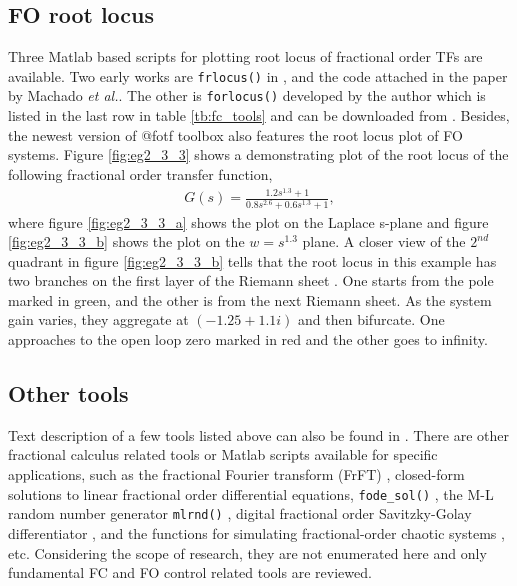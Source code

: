 \documentclass[11pt]{tCON2e}
\theoremstyle{plain}\newtheorem{theorem}{Theorem}
\theoremstyle{definition}
\theoremstyle{remark}
\begin{document}
\subsection{FO root locus}
Three Matlab based scripts for plotting root locus of fractional order TFs are available. Two early works are {\tt frlocus()} in \cite{ref:flocus_matlab}, and the code attached in the paper \cite{ref:rlocus_Machado_with_code} by Machado \emph{et al.}. The other is {\tt forlocus()} developed by the author which is listed in the last row in table \ref{tb:fc_tools} and can be downloaded from \cite{ref:FO_RL_mine}. Besides, the newest version of @fotf toolbox also features the root locus plot of FO systems. Figure \ref{fig:eg2_3_3} shows a demonstrating plot of the root locus of the following fractional order transfer function,
\begin{eqnarray}
\label{eqn:eg_2.3.3}
G(s) = \frac{1.2s^{1.3}+1}{0.8s^{2.6}+0.6s^{1.3}+1},
\end{eqnarray}
where figure \ref{fig:eg2_3_3_a} shows the plot on the Laplace s-plane and figure \ref{fig:eg2_3_3_b} shows the plot on the $w=s^{1.3}$ plane.
A closer view of the $2^{nd}$ quadrant in figure \ref{fig:eg2_3_3_b} tells that the root locus in this example has two branches on the first layer of the Riemann sheet \cite{ref:RiemannSurfaces, ref:RiemannSurfacesBook}. One starts from the pole marked in green, and the other is from the next Riemann sheet. As the system gain varies, they aggregate at $(-1.25+1.1i)$ and then bifurcate. One approaches to the open loop zero marked in red and the other goes to infinity.






\subsection{Other tools}
Text description of a few tools listed above can also be found in \cite{ref:FO_in_Matlab_Petras}.
There are other fractional calculus related tools or Matlab scripts available for specific applications, such as the fractional Fourier transform (FrFT) \cite{ref:FrFT_book_2001, ref:FrFT_paper_2003}, closed-form solutions to linear fractional order differential equations, {\tt fode\_sol()} \cite{ref:Monje}, the M-L random number generator {\tt mlrnd()}  \cite{ref:mlrnd}, digital fractional order Savitzky-Golay differentiator \cite{ref:Dali_Golay_filter}, and the functions for simulating fractional-order chaotic systems \cite{ref:Petras2}, etc. Considering the scope of research, they are not enumerated here and only fundamental FC and FO control related tools are reviewed.
\end{document}

